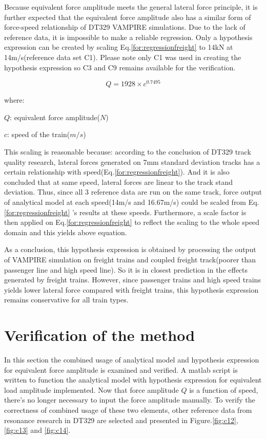 Because equivalent force amplitude meets the general lateral force principle, it is further expected that the equivalent force amplitude also has a similar form of force-speed relationship of DT329 VAMPIRE simulations. Due to the lack of reference data, it is impossible to make a reliable regression. Only a hypothesis expression can be created by scaling Eq.\ref{for:regressionfreight} to 14kN at 14m/s(reference data set C1). Please note only C1 was used in creating the hypothesis expression so C3 and C9 remains available for the verification.

\begin{equation}
    Q= 1928\times c^{0.7495}
\end{equation}

where:

$Q$: equivalent force amplitude($N$)

$c$: speed of the train($m/s$)

This scaling is reasonable because: according to the conclusion of DT329 track quality research, lateral forces generated on 7mm standard deviation tracks has a certain relationship with speed(Eq.\ref{for:regressionfreight}). And it is also concluded that at same speed, lateral forces are linear to the track stand deviation. Thus, since all 3 reference data are run on the same track, force output of analytical model at each speed(14m/s and 16.67m/s) could be scaled from Eq.\ref{for:regressionfreight} 's results at these speeds. Furthermore, a scale factor is then applied on Eq.\ref{for:regressionfreight} to reflect the scaling to the whole speed domain and this yields above equation.

As a conclusion, this hypothesis expression is obtained by processing the output of VAMPIRE simulation on freight trains and coupled freight track(poorer than passenger line and high speed line). So it is in closest prediction in the effects generated by freight trains. However, since passenger trains and high speed trains yields lower lateral force compared with freight trains, this hypothesis expression remains conservative for all train types.

\section{Verification of the method}

In this section the combined usage of analytical model and hypothesis expression for equivalent force amplitude is examined and verified. A matlab script is written to function the analytical model with hypothesis expression for equivalent load amplitude implemented. Now that force amplitude $Q$ is a function of speed, there's no longer necessary to input the force amplitude manually. To verify the correctness of combined usage of these two elements, other reference data from resonance research in DT329 are selected and presented in Figure.\ref{fig:c12}, \ref{fig:c13} and \ref{fig:c14}. 

